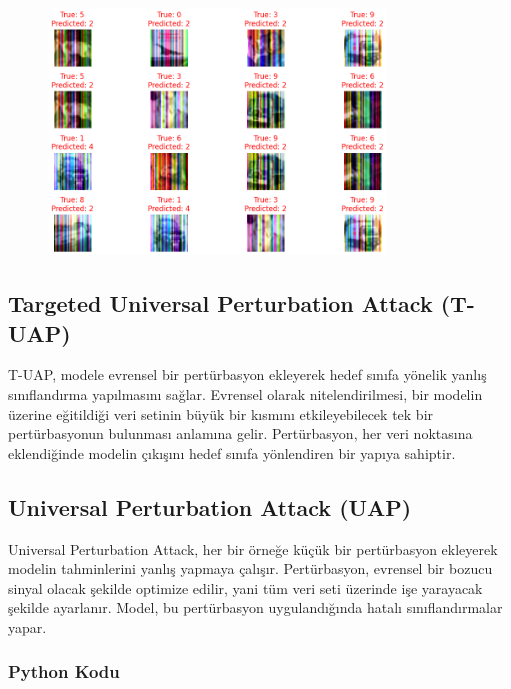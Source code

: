 \begin{figure}[h]
    \centering
    \includegraphics[width=0.8\textwidth]{images/square_attack_results.png}
    \caption{}
\end{figure}

\newpage

\subsection{Targeted Universal Perturbation Attack (T-UAP)}

T-UAP, modele evrensel bir pertürbasyon ekleyerek hedef sınıfa yönelik yanlış sınıflandırma yapılmasını sağlar. Evrensel olarak nitelendirilmesi, bir modelin üzerine eğitildiği veri setinin büyük bir kısmını etkileyebilecek tek bir pertürbasyonun bulunması anlamına gelir. Pertürbasyon, her veri noktasına eklendiğinde modelin çıkışını hedef sınıfa yönlendiren bir yapıya sahiptir.

\newpage

\subsection{Universal Perturbation Attack (UAP)}

Universal Perturbation Attack, her bir örneğe küçük bir pertürbasyon ekleyerek modelin tahminlerini yanlış yapmaya çalışır. Pertürbasyon, evrensel bir bozucu sinyal olacak şekilde optimize edilir, yani tüm veri seti üzerinde işe yarayacak şekilde ayarlanır. Model, bu pertürbasyon uygulandığında hatalı sınıflandırmalar yapar.

\subsubsection{Python Kodu}

